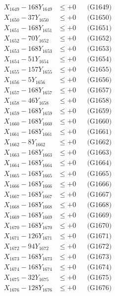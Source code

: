 \documentclass[a4paper,10pt]{article}
\begin{document}
{\begin{align}
X_{1649} - 168Y_{1649} &\leq +0 && \text{(G1649)} \\
X_{1650} - 37Y_{1650} &\leq +0 && \text{(G1650)} \\
\allowbreak
X_{1651} - 168Y_{1651} &\leq +0 && \text{(G1651)} \\
X_{1652} - 70Y_{1652} &\leq +0 && \text{(G1652)} \\
X_{1653} - 168Y_{1653} &\leq +0 && \text{(G1653)} \\
X_{1654} - 51Y_{1654} &\leq +0 && \text{(G1654)} \\
X_{1655} - 157Y_{1655} &\leq +0 && \text{(G1655)} \\
X_{1656} - 5Y_{1656} &\leq +0 && \text{(G1656)} \\
X_{1657} - 168Y_{1657} &\leq +0 && \text{(G1657)} \\
X_{1658} - 46Y_{1658} &\leq +0 && \text{(G1658)} \\
X_{1659} - 168Y_{1659} &\leq +0 && \text{(G1659)} \\
X_{1660} - 168Y_{1660} &\leq +0 && \text{(G1660)} \\
\allowbreak
X_{1661} - 168Y_{1661} &\leq +0 && \text{(G1661)} \\
X_{1662} - 8Y_{1662} &\leq +0 && \text{(G1662)} \\
X_{1663} - 168Y_{1663} &\leq +0 && \text{(G1663)} \\
X_{1664} - 168Y_{1664} &\leq +0 && \text{(G1664)} \\
X_{1665} - 168Y_{1665} &\leq +0 && \text{(G1665)} \\
X_{1666} - 168Y_{1666} &\leq +0 && \text{(G1666)} \\
X_{1667} - 168Y_{1667} &\leq +0 && \text{(G1667)} \\
X_{1668} - 168Y_{1668} &\leq +0 && \text{(G1668)} \\
X_{1669} - 168Y_{1669} &\leq +0 && \text{(G1669)} \\
X_{1670} - 168Y_{1670} &\leq +0 && \text{(G1670)} \\
\allowbreak
X_{1671} - 126Y_{1671} &\leq +0 && \text{(G1671)} \\
X_{1672} - 94Y_{1672} &\leq +0 && \text{(G1672)} \\
X_{1673} - 168Y_{1673} &\leq +0 && \text{(G1673)} \\
X_{1674} - 168Y_{1674} &\leq +0 && \text{(G1674)} \\
X_{1675} - 32Y_{1675} &\leq +0 && \text{(G1675)} \\
X_{1676} - 128Y_{1676} &\leq +0 && \text{(G1676)} \\

\end{align}}
\end{document}
